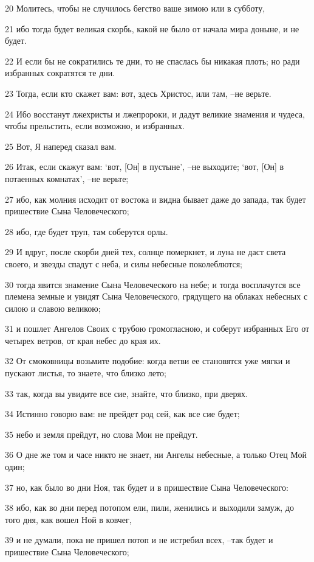 \par 20 Молитесь, чтобы не случилось бегство ваше зимою или в субботу,
\par 21 ибо тогда будет великая скорбь, какой не было от начала мира доныне, и не будет.
\par 22 И если бы не сократились те дни, то не спаслась бы никакая плоть; но ради избранных сократятся те дни.
\par 23 Тогда, если кто скажет вам: вот, здесь Христос, или там, --не верьте.
\par 24 Ибо восстанут лжехристы и лжепророки, и дадут великие знамения и чудеса, чтобы прельстить, если возможно, и избранных.
\par 25 Вот, Я наперед сказал вам.
\par 26 Итак, если скажут вам: `вот, [Он] в пустыне', --не выходите; `вот, [Он] в потаенных комнатах', --не верьте;
\par 27 ибо, как молния исходит от востока и видна бывает даже до запада, так будет пришествие Сына Человеческого;
\par 28 ибо, где будет труп, там соберутся орлы.
\par 29 И вдруг, после скорби дней тех, солнце померкнет, и луна не даст света своего, и звезды спадут с неба, и силы небесные поколеблются;
\par 30 тогда явится знамение Сына Человеческого на небе; и тогда восплачутся все племена земные и увидят Сына Человеческого, грядущего на облаках небесных с силою и славою великою;
\par 31 и пошлет Ангелов Своих с трубою громогласною, и соберут избранных Его от четырех ветров, от края небес до края их.
\par 32 От смоковницы возьмите подобие: когда ветви ее становятся уже мягки и пускают листья, то знаете, что близко лето;
\par 33 так, когда вы увидите все сие, знайте, что близко, при дверях.
\par 34 Истинно говорю вам: не прейдет род сей, как все сие будет;
\par 35 небо и земля прейдут, но слова Мои не прейдут.
\par 36 О дне же том и часе никто не знает, ни Ангелы небесные, а только Отец Мой один;
\par 37 но, как было во дни Ноя, так будет и в пришествие Сына Человеческого:
\par 38 ибо, как во дни перед потопом ели, пили, женились и выходили замуж, до того дня, как вошел Ной в ковчег,
\par 39 и не думали, пока не пришел потоп и не истребил всех, --так будет и пришествие Сына Человеческого;

